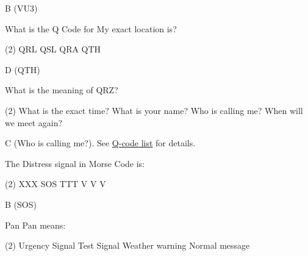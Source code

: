 \documentclass[a4paper]{article}
\begin{document}
\begin{solution}
	B (VU3)
\end{solution}

\vspace{5mm}



\begin{question}What is the Q Code for \apostrophe{}My exact location is\apostrophe{}?
	\begin{tasks}(2)
		\task QRL
		\task QSL
		\task QRA
		\task QTH
	\end{tasks}
\end{question}

\begin{solution}
	D (QTH)
\end{solution}

\vspace{5mm}



\begin{question}What is the meaning of QRZ?
	\begin{tasks}(2)
		\task What is the exact time?
		\task What is your name?
		\task Who is calling me?
		\task When will we meet again?
	\end{tasks}
\end{question}

\begin{solution}
	C (Who is calling me?). See \href{http://www.giangrandi.ch/electronics/radio/qcode.shtml}{Q-code list} for details.
\end{solution}

\vspace{5mm}



\begin{question}The Distress signal in Morse Code is:
	\begin{tasks}(2)
		\task XXX
		\task SOS
		\task TTT
		\task V V V
	\end{tasks}
\end{question}

\begin{solution}
	B (SOS)
\end{solution}

\vspace{5mm}



\begin{question}Pan Pan means:
	\begin{tasks}(2)
		\task Urgency Signal
		\task Test Signal
		\task Weather warning
		\task Normal message
	\end{tasks}
\end{question}
\end{document}
